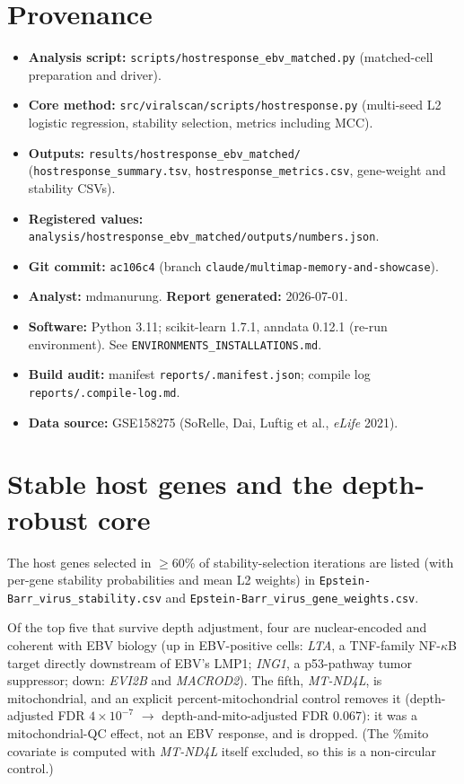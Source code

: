 \documentclass[11pt]{article}
\begin{document}
\section{Provenance}
\begin{itemize}
  \item \textbf{Analysis script:} \texttt{scripts/hostresponse\_ebv\_matched.py}
  (matched-cell preparation and driver).
  \item \textbf{Core method:} \texttt{src/viralscan/scripts/hostresponse.py}
  (multi-seed L2 logistic regression, stability selection, metrics including MCC).
  \item \textbf{Outputs:} \texttt{results/hostresponse\_ebv\_matched/}
  (\texttt{hostresponse\_summary.tsv}, \texttt{hostresponse\_metrics.csv},
  gene-weight and stability CSVs).
  \item \textbf{Registered values:}
  \texttt{analysis/hostresponse\_ebv\_matched/outputs/numbers.json}.
  \item \textbf{Git commit:} \texttt{ac106c4} (branch
  \texttt{claude/multimap-memory-and-showcase}).
  \item \textbf{Analyst:} mdmanurung. \textbf{Report generated:} 2026-07-01.
  \item \textbf{Software:} Python 3.11; scikit-learn 1.7.1, anndata 0.12.1
  (re-run environment). See \texttt{ENVIRONMENTS\_INSTALLATIONS.md}.
  \item \textbf{Build audit:} manifest \texttt{reports/.manifest.json};
  compile log \texttt{reports/.compile-log.md}.
  \item \textbf{Data source:} GSE158275 (SoRelle, Dai, Luftig et al.,
  \emph{eLife} 2021).
\end{itemize}

\appendix
\section{Stable host genes and the depth-robust core}
The  host genes selected in $\geq$60\% of
stability-selection iterations are listed (with per-gene stability probabilities and
mean L2 weights) in \texttt{Epstein-Barr\_virus\_stability.csv} and
\texttt{Epstein-Barr\_virus\_gene\_weights.csv}.

Of the top five that survive depth adjustment, four are nuclear-encoded and coherent
with EBV biology (up in EBV-positive cells: \textit{LTA}, a TNF-family NF-$\kappa$B
target directly downstream of EBV's LMP1; \textit{ING1}, a p53-pathway tumor
suppressor; down: \textit{EVI2B} and \textit{MACROD2}). The fifth, \textit{MT-ND4L}, is
mitochondrial, and an explicit percent-mitochondrial control removes it (depth-adjusted
FDR $4\times10^{-7}$ $\rightarrow$ depth-and-mito-adjusted FDR $0.067$): it was a
mitochondrial-QC effect, not an EBV response, and is dropped. (The \%mito covariate is
computed with \textit{MT-ND4L} itself excluded, so this is a non-circular control.)
\end{document}
